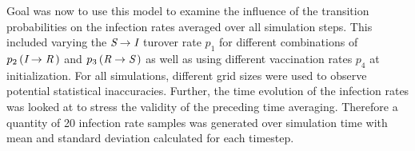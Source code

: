 Goal was now to use this model to examine the influence of the transition probabilities on the infection rates averaged over all simulation steps. This included varying the $\textit{S}\rightarrow\textit{I}$ turover rate $p_1$
for different combinations of $p_2\left(\textit{I}\rightarrow\textit{R}\,\right)$ and $p_3\left(\textit{R}\rightarrow\textit{S}\,\right)$ as well as using different vaccination rates $p_4$ at initialization. 
For all simulations, different grid sizes were used to observe potential statistical inaccuracies.\newline
Further, the time evolution of the infection rates was looked at to stress the validity of the preceding time averaging. Therefore a quantity of 20 infection rate samples was generated over simulation time
with mean and standard deviation calculated for each timestep.